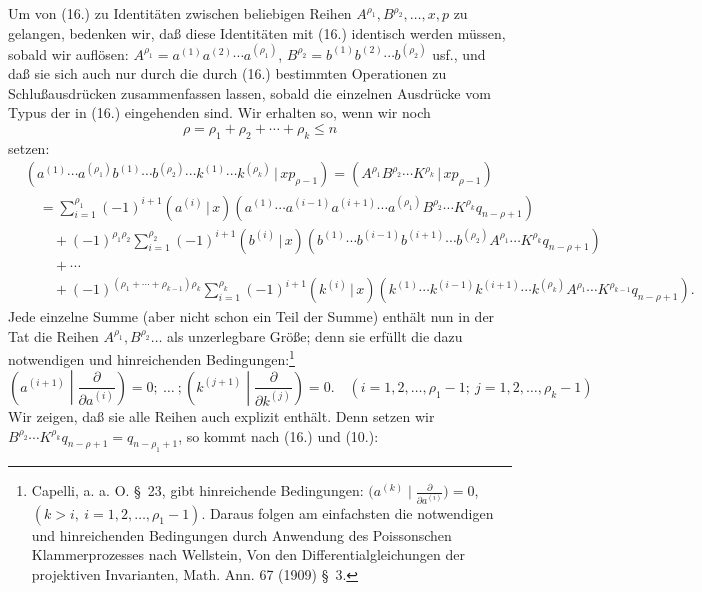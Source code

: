 \documentclass[11pt]{article}
\providecommand{\pair}[2]{(#1\,|\,#2)}
\begin{document}
Um von (16.) zu Identitäten zwischen beliebigen Reihen $A^{\rho_1},B^{\rho_2},\ldots,x,p$ zu gelangen, bedenken wir, daß diese Identitäten mit (16.) identisch werden müssen, sobald wir auflösen: $A^{\rho_1}=a^{(1)}a^{(2)}\cdots a^{(\rho_1)}$, $B^{\rho_2}=b^{(1)}b^{(2)}\cdots b^{(\rho_2)}$ usf., und daß sie sich auch nur durch die durch (16.) bestimmten Operationen zu Schlußausdrücken zusammenfassen lassen, sobald die einzelnen Ausdrücke vom Typus der in (16.) eingehenden sind. Wir erhalten so, wenn wir noch
\begin{equation}
 \rho=\rho_1+\rho_2+\cdots+\rho_k\le n
\tag{18}
\end{equation}
setzen:
\begin{align*}
&\pair{a^{(1)}\cdots a^{(\rho_1)}b^{(1)}\cdots b^{(\rho_2)}\cdots k^{(1)}\cdots k^{(\rho_k)}}{xp_{\rho-1}}
  =\pair{A^{\rho_1}B^{\rho_2}\cdots K^{\rho_k}}{xp_{\rho-1}} \\
&\quad=\sum_{i=1}^{\rho_1}(-1)^{i+1}\pair{a^{(i)}}{x}(a^{(1)}\cdots a^{(i-1)}a^{(i+1)}\cdots a^{(\rho_1)}B^{\rho_2}\cdots K^{\rho_k}q_{n-\rho+1})\\
&\qquad+(-1)^{\rho_1\rho_2}\sum_{i=1}^{\rho_2}(-1)^{i+1}\pair{b^{(i)}}{x}(b^{(1)}\cdots b^{(i-1)}b^{(i+1)}\cdots b^{(\rho_2)}A^{\rho_1}\cdots K^{\rho_k}q_{n-\rho+1})\\
&\qquad+\cdots\\
&\qquad+(-1)^{(\rho_1+\cdots+\rho_{k-1})\rho_k}\sum_{i=1}^{\rho_k}(-1)^{i+1}\pair{k^{(i)}}{x}(k^{(1)}\cdots k^{(i-1)}k^{(i+1)}\cdots k^{(\rho_k)}A^{\rho_1}\cdots K^{\rho_{k-1}}q_{n-\rho+1}).
\end{align*}
Jede einzelne Summe (aber nicht schon ein Teil der Summe) enthält nun in der Tat die Reihen $A^{\rho_1},B^{\rho_2}\ldots$ als unzerlegbare Größe; denn sie erfüllt die dazu notwendigen und hinreichenden Bedingungen:\footnote{Capelli, a. a. O. \S\ 23, gibt hinreichende Bedingungen: $\bigl(a^{(k)}\mid \frac{\partial}{\partial a^{(i)}}\bigr)=0$, $(k>i,\ i=1,2,\ldots,\rho_1-1)$. Daraus folgen am einfachsten die notwendigen und hinreichenden Bedingungen durch Anwendung des Poissonschen Klammerprozesses nach Wellstein, Von den Differentialgleichungen der projektiven Invarianten, Math. Ann. 67 (1909) \S\ 3.}
\begin{equation}
 \left(a^{(i+1)}\middle|\frac{\partial}{\partial a^{(i)}}\right)=0;\ \ldots\ ;
 \left(k^{(j+1)}\middle|\frac{\partial}{\partial k^{(j)}}\right)=0.
 \quad (i=1,2,\ldots,\rho_1-1;\ j=1,2,\ldots,\rho_k-1)
\tag{19}
\end{equation}
Wir zeigen, daß sie alle Reihen auch explizit enthält. Denn setzen wir $B^{\rho_2}\cdots K^{\rho_k}q_{n-\rho+1}=q_{n-\rho_1+1}$, so kommt nach (16.) und (10.):
\end{document}
